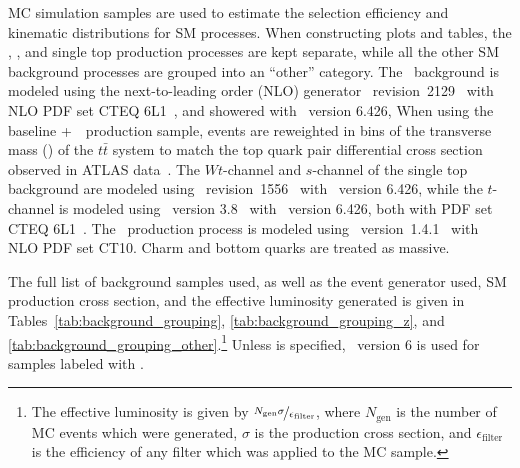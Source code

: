 MC simulation samples are used to estimate the selection efficiency
and kinematic distributions for SM processes.
When constructing plots and tables, the \TTBAR, \ZGAMMAJETS, and single top
production processes are kept separate, while all the other SM background
processes are grouped into an ``other'' category.
The \TTBAR\ background is modeled using the next-to-leading order (NLO)
generator \POWHEG\ 
revision~2129~\cite{Nason:2004rx, Frixione:2007vw, Alioli:2010xd,
Frixione:2007nw} with NLO PDF set CTEQ 6L1~\cite{Nadolsky:2008zw}, and 
showered with \PYTHIA\ version 6.426,
When using the baseline \POWHEG+\PYTHIA\ \TTBAR\ production sample,
events are reweighted in bins of the transverse mass (\pt) of the
$t\bar{t}$ system to match the top quark pair differential cross section
observed in ATLAS data~\cite{Aad:2012hg,Aad:2014zka}.
The $Wt$-channel and $s$-channel of the single top background are modeled using
\POWHEG\ revision~1556~\cite{Alioli:2009je}
with \PYTHIA\ version 6.426, while the $t$-channel is modeled using
\acermc\ version 3.8~\cite{Kersevan:2004yg} with \PYTHIA\ version 6.426,
both with PDF set CTEQ 6L1~\cite{Nadolsky:2008zw}.
The \ZGAMMAJETS\ production process is modeled using
\SHERPA\ version~1.4.1~\cite{Gleisberg:2008ta} with NLO PDF set CT10.
Charm and bottom quarks are treated as massive.

The full list of background samples used, as well as the event generator used,
SM production cross section, and the effective luminosity generated is given in 
Tables~\ref{tab:background_grouping}, \ref{tab:background_grouping_z},
and \ref{tab:background_grouping_other}.\footnote{The effective luminosity is
given by $\nicefrac{N_\mathrm{gen}\sigma}{\epsilon_\mathrm{filter}}$, where
$N_\mathrm{gen}$ is the number of MC events which were generated, $\sigma$ is
the production cross section, and $\epsilon_\mathrm{filter}$ is the efficiency
of any filter which was applied to the MC sample.}
Unless  is specified, \pythia\ version 6 is used for samples labeled
with \pythia.

